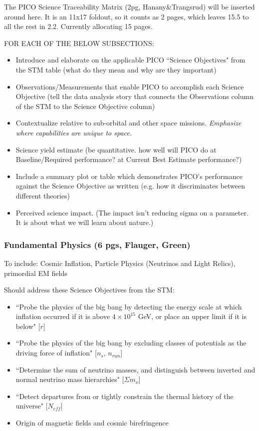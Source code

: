 \documentclass[12pt]{article}
\begin{document}
  The PICO Science Traceability Matrix (2pg, Hanany\&Trangsrud) will be inserted around here.  It is an 11x17 foldout, so it counts as 2 pages, which leaves 15.5 to all the rest in 2.2. Currently allocating 15 pages.  
    
    \vspace{12pt}
     FOR EACH OF THE BELOW SUBSECTIONS:
    \begin{itemize}
    \item Introduce and elaborate on the applicable PICO ``Science Objectives" from the STM table (what do they mean and why are they important)
    \item Observations/Measurements that enable PICO to accomplish each Science Objective (tell the data analysis story that connects the Observations column of the STM to the Science Objective column)
    \item Contextualize relative to sub-orbital and other space missions. {\it Emphasize where capabilities are unique to space.}
    \item Science yield estimate (be quantitative. how well will PICO do at Baseline/Required performance? at Current Best Estimate performance?)
    \item Include a summary plot or table which demonstrates PICO's performance against the Science Objective as written (e.g. how it discriminates between different theories) 
    \item Perceived science impact. (The impact isn't reducing sigma on a parameter.  It is about what we will learn about nature.)
    \end{itemize}


\subsubsection{Fundamental Physics (6 pgs, Flauger, Green)}

To include: Cosmic Inflation, Particle Physics (Neutrinos and Light Relics), primordial EM fields

        Should address these Science Objectives from the STM:
        \begin{itemize}
        \item ``Probe the physics of the big bang by detecting the energy scale at which inflation occurred if it is above $4\times10^{15}$ GeV, or place an upper limit if it is below" [$r$]
        \item ``Probe the physics of the big bang by excluding classes of potentials as the driving force of inflation" [$n_s$, $n_{run}$]
        \item ``Determine the sum of neutrino masses, and distinguish between inverted and normal neutrino mass hierarchies" [$\Sigma m_{\nu}$]
        \item ``Detect departures from or tightly constrain the thermal history of the universe" [$N_{eff}$]
        \item Origin of magnetic fields and cosmic birefringence
        \end{itemize} 
\end{document}
